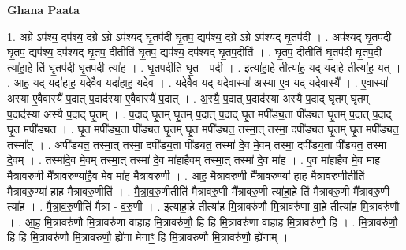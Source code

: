 \documentclass[17pt]{extarticle}
\begin{document}
\textbf{Ghana Paata } \newline

1. अग्रे ऽप॑श्य॒ दप॑श्य॒ दग्रे ऽग्रे ऽप॑श्यद् घृ॒तप॑दी घृ॒तप॒ द्यप॑श्य॒ दग्रे ऽग्रे ऽप॑श्यद् घृ॒तप॑दी । . अप॑श्यद् घृ॒तप॑दी घृ॒तप॒ द्यप॑श्य॒ दप॑श्यद् घृ॒तप॒ दीतीति॑ घृ॒तप॒ द्यप॑श्य॒ दप॑श्यद् घृ॒तप॒दीति॑ । . घृ॒तप॒ दीतीति॑ घृ॒तप॑दी घृ॒तप॒दी त्या॑हा॒हे ति॑ घृ॒तप॑दी घृ॒तप॒दी त्या॑ह । . घृ॒तप॒दीति॑ घृ॒त - प॒दी॒ । . इत्या॑हा॒हे तीत्या॑ह॒ यद् यदा॒हे तीत्या॑ह॒ यत् । . आ॒ह॒ यद् यदा॑हाह॒ यदे॒वैव यदा॑हाह॒ यदे॒व । . यदे॒वैव यद् यदे॒वास्या॑ अस्या ए॒व यद् यदे॒वास्यै᳚ । . ए॒वास्या॑ अस्या ए॒वैवास्यै॑ प॒दात् प॒दाद॑स्या ए॒वैवास्यै॑ प॒दात् । . अ॒स्यै॒ प॒दात् प॒दाद॑स्या अस्यै प॒दाद् घृ॒तम् घृ॒तम् प॒दाद॑स्या अस्यै प॒दाद् घृ॒तम् । . प॒दाद् घृ॒तम् घृ॒तम् प॒दात् प॒दाद् घृ॒त मपी᳚ड्य॒ता पी᳚ड्यत घृ॒तम् प॒दात् प॒दाद् घृ॒त मपी᳚ड्यत । . घृ॒त मपी᳚ड्य॒ता पी᳚ड्यत घृ॒तम् घृ॒त मपी᳚ड्यत॒ तस्मा॒त् तस्मा॒ दपी᳚ड्यत घृ॒तम् घृ॒त मपी᳚ड्यत॒ तस्मा᳚त् । . अपी᳚ड्यत॒ तस्मा॒त् तस्मा॒ दपी᳚ड्य॒ता पी᳚ड्यत॒ तस्मा॑ दे॒व मे॒वम् तस्मा॒ दपी᳚ड्य॒ता पी᳚ड्यत॒ तस्मा॑ दे॒वम् । . तस्मा॑दे॒व मे॒वम् तस्मा॒त् तस्मा॑ दे॒व मा॑हाहै॒वम् तस्मा॒त् तस्मा॑ दे॒व मा॑ह । . ए॒व मा॑हाहै॒व मे॒व मा॑ह मैत्रावरु॒णी मै᳚त्रावरु॒ण्या॑है॒व मे॒व मा॑ह मैत्रावरु॒णी । . आ॒ह॒ मै॒त्रा॒व॒रु॒णी मै᳚त्रावरु॒ण्या॑ हाह मैत्रावरु॒णीतीति॑ मैत्रावरु॒ण्या॑ हाह मैत्रावरु॒णीति॑ । . मै॒त्रा॒व॒रु॒णीतीति॑ मैत्रावरु॒णी मै᳚त्रावरु॒णी त्या॑हा॒हे ति॑ मैत्रावरु॒णी मै᳚त्रावरु॒णी त्या॑ह । . मै॒त्रा॒व॒रु॒णीति॑ मैत्रा - व॒रु॒णी । . इत्या॑हा॒हे तीत्या॑ह मि॒त्रावरु॑णौ मि॒त्रावरु॑णा वा॒हे तीत्या॑ह मि॒त्रावरु॑णौ । . आ॒ह॒ मि॒त्रावरु॑णौ मि॒त्रावरु॑णा वाहाह मि॒त्रावरु॑णौ॒ हि हि मि॒त्रावरु॑णा वाहाह मि॒त्रावरु॑णौ॒ हि । . मि॒त्रावरु॑णौ॒ हि हि मि॒त्रावरु॑णौ मि॒त्रावरु॑णौ॒ ह्ये॑ना मेनाꣳ॒॒ हि मि॒त्रावरु॑णौ मि॒त्रावरु॑णौ॒ ह्ये॑नाम् । \newline
\end{document}

